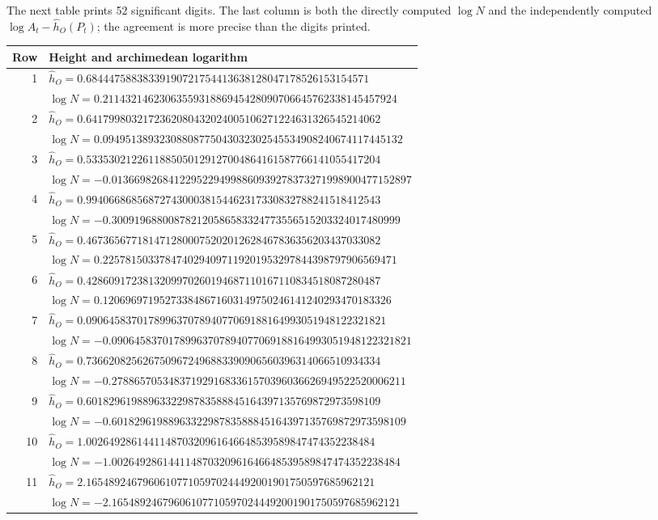 \endgroup
\noindent The next table prints 52 significant digits. The last column is both the directly computed $\log N$ and the independently computed $\log A_t-\widehat h_O(P_t)$; the agreement is more precise than the digits printed.
\begingroup\small
\begin{longtable}{r l}
\toprule Row & Height and archimedean logarithm\\\midrule\endhead
1 & $\widehat h_O=0.68444758838339190721754413638128047178526153154571$\\
 & $\log N=0.2114321462306355931886945428090706645762338145457924$\\[3pt]
2 & $\widehat h_O=0.6417998032172362080432024005106271224631326545214062$\\
 & $\log N=0.09495138932308808775043032302545534908240674117445132$\\[3pt]
3 & $\widehat h_O=0.5335302122611885050129127004864161587766141055417204$\\
 & $\log N=-0.01366982684122952294998860939278373271998900477152897$\\[3pt]
4 & $\widehat h_O=0.9940668685687274300038154462317330832788241518412543$\\
 & $\log N=-0.300919688008782120586583324773556515203324017480999$\\[3pt]
5 & $\widehat h_O=0.4673656771814712800075202012628467836356203437033082$\\
 & $\log N=0.2257815033784740294097119201953297844398797906569471$\\[3pt]
6 & $\widehat h_O=0.4286091723813209970260194687110167110834518087280487$\\
 & $\log N=0.120696971952733848671603149750246141240293470183326$\\[3pt]
7 & $\widehat h_O=0.09064583701789963707894077069188164993051948122321821$\\
 & $\log N=-0.09064583701789963707894077069188164993051948122321821$\\[3pt]
8 & $\widehat h_O=0.7366208256267509672496883390906560396314066510934334$\\
 & $\log N=-0.2788657053483719291683361570396036626949522520006211$\\[3pt]
9 & $\widehat h_O=0.6018296198896332298783588845164397135769872973598109$\\
 & $\log N=-0.6018296198896332298783588845164397135769872973598109$\\[3pt]
10 & $\widehat h_O=1.002649286144114870320961646648539589847474352238484$\\
 & $\log N=-1.002649286144114870320961646648539589847474352238484$\\[3pt]
11 & $\widehat h_O=2.165489246796061077105970244492001901750597685962121$\\
 & $\log N=-2.165489246796061077105970244492001901750597685962121$\\[3pt]
\bottomrule\end{longtable}\endgroup
